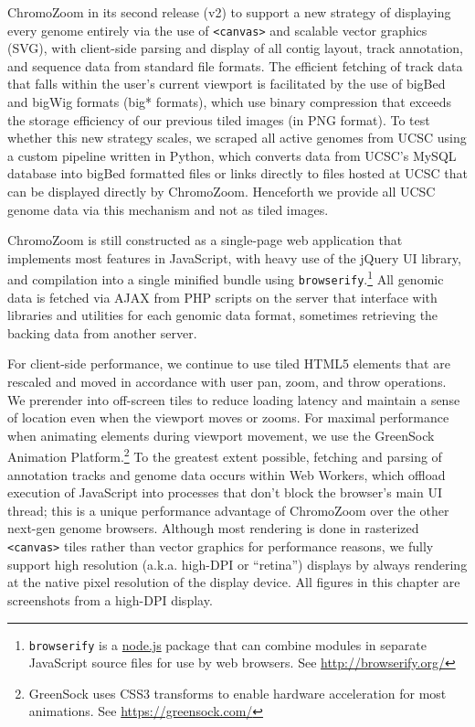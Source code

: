  ChromoZoom in its second release (v2) to support a new strategy of displaying every genome entirely via the use of \texttt{<canvas>} and scalable vector graphics (SVG), with client-side parsing and display of all contig layout, track annotation, and sequence data from standard file formats. The efficient fetching of track data that falls within the user's current viewport is facilitated by the use of bigBed and bigWig formats (big* formats),\autocite{Kent2010} which use binary compression that exceeds the storage efficiency of our previous tiled images (in PNG format). To test whether this new strategy scales, we scraped all active genomes from UCSC using a custom pipeline written in Python, which converts data from UCSC's MySQL database into bigBed formatted files or links directly to files hosted at UCSC that can be displayed directly by ChromoZoom. Henceforth we provide all UCSC genome data via this mechanism and not as tiled images.

ChromoZoom is still constructed as a single-page web application that implements most features in JavaScript, with heavy use of the jQuery UI library, and compilation into a single minified bundle using \texttt{browserify}.\footnote{\texttt{browserify} is a \href{https://nodejs.org/}{node.js} package that can combine modules in separate JavaScript source files for use by web browsers. See \url{http://browserify.org/}} All genomic data is fetched via AJAX from PHP scripts on the server that interface with libraries and utilities for each genomic data format, sometimes retrieving the backing data from another server.

For client-side performance, we continue to use tiled HTML5 elements that are rescaled and moved in accordance with user pan, zoom, and throw operations. We prerender into off-screen tiles to reduce loading latency and maintain a sense of location even when the viewport moves or zooms. For maximal performance when animating elements during viewport movement, we use the GreenSock Animation Platform.\footnote{GreenSock uses CSS3 transforms to enable hardware acceleration for most animations. See \url{https://greensock.com/}} To the greatest extent possible, fetching and parsing of annotation tracks and genome data occurs within Web Workers, which offload execution of JavaScript into processes that don't block the browser's main UI thread; this is a unique performance advantage of ChromoZoom over the other next-gen genome browsers.\autocite{Buels2016,Down2011,Vanderkam2016} Although most rendering is done in rasterized \texttt{<canvas>} tiles rather than vector graphics for performance reasons, we fully support high resolution (a.k.a. high-DPI or ``retina'') displays by always rendering at the native pixel resolution of the display device. All figures in this chapter are screenshots from a high-DPI display.

